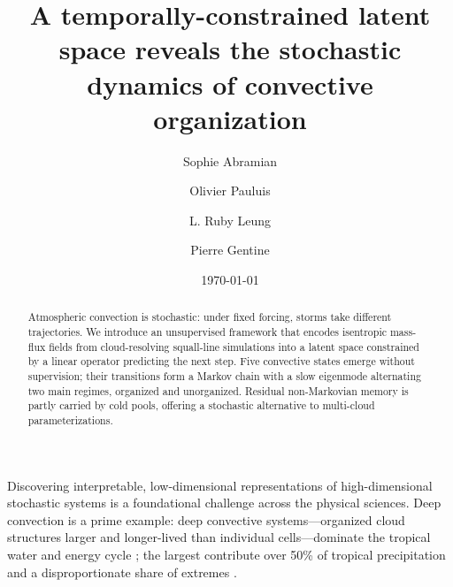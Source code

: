 \documentclass[
    aps,
    prl,
    reprint,
    superscriptaddress,
    amsmath,amssymb,
    floatfix,
    nofootinbib
]{revtex4-2}
\begin{document}
\title{A temporally-constrained latent space reveals the stochastic dynamics of convective organization}

\author{Sophie Abramian}

\author{Olivier Pauluis}

\author{L. Ruby Leung}

\author{Pierre Gentine}

\date{\today}

\begin{abstract}
Atmospheric convection is stochastic: under fixed forcing, storms take different trajectories. We introduce an unsupervised framework that encodes isentropic mass-flux fields from cloud-resolving squall-line simulations into a latent space constrained by a linear operator predicting the next step. Five convective states emerge without supervision; their transitions form a Markov chain with a slow eigenmode alternating two main regimes, organized and unorganized. Residual non-Markovian memory is partly carried by cold pools, offering a stochastic alternative to multi-cloud parameterizations.
\end{abstract}

\maketitle
\onecolumngrid   %
\onehalfspacing  %
\linenumbers

Discovering interpretable, low-dimensional representations of high-dimensional stochastic systems is a foundational challenge across the physical sciences. Deep convection is a prime example: deep convective systems---organized cloud structures larger and longer-lived than individual cells---dominate the tropical water and energy cycle \cite{houze2004mesoscale, chakraborty2023overview}; the largest contribute over 50\% of tropical precipitation and a disproportionate share of extremes \cite{roca2020extreme, feng2024mesoscale, feng2023mesoscale}.
\end{document}
